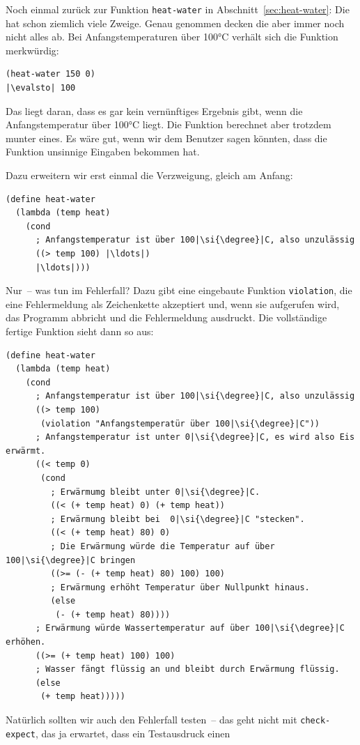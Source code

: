 Noch einmal zurück zur Funktion \lstinline{heat-water} in
Abschnitt~\ref{sec:heat-water}: Die hat schon ziemlich viele Zweige.
Genau genommen decken die aber immer noch nicht alles ab.  %
Bei Anfangstemperaturen über 100\si{\degree}C verhält sich die Funktion merkwürdig:
%
\begin{lstlisting}
(heat-water 150 0)
|\evalsto| 100
\end{lstlisting}
%
Das liegt daran, dass es gar kein vernünftiges Ergebnis gibt, wenn die
Anfangstemperatur über 100\si{\degree}C liegt.  Die Funktion berechnet aber
trotzdem munter eines.  Es wäre gut, wenn wir dem Benutzer sagen
könnten, dass die Funktion unsinnige Eingaben bekommen hat.

Dazu erweitern wir erst einmal die Verzweigung, gleich am Anfang:
%
\begin{lstlisting}
(define heat-water
  (lambda (temp heat)
    (cond
      ; Anfangstemperatur ist über 100|\si{\degree}|C, also unzulässig
      ((> temp 100) |\ldots|)
      |\ldots|)))
\end{lstlisting}
%
Nur~-- was tun im Fehlerfall?  Dazu gibt eine eingebaute Funktion
\lstinline{violation},\label{sec:violation} die eine Fehlermeldung als Zeichenkette akzeptiert
und, wenn sie aufgerufen wird, das Programm abbricht und die
Fehlermeldung ausdruckt.  Die vollständige fertige Funktion sieht
dann so aus:
%
\begin{lstlisting}
(define heat-water
  (lambda (temp heat)
    (cond
      ; Anfangstemperatur ist über 100|\si{\degree}|C, also unzulässig
      ((> temp 100)
       (violation "Anfangstemperatür über 100|\si{\degree}|C"))
      ; Anfangstemperatur ist unter 0|\si{\degree}|C, es wird also Eis erwärmt.
      ((< temp 0)
       (cond
         ; Erwärmumg bleibt unter 0|\si{\degree}|C.
         ((< (+ temp heat) 0) (+ temp heat))
         ; Erwärmung bleibt bei  0|\si{\degree}|C "stecken".
         ((< (+ temp heat) 80) 0)
         ; Die Erwärmung würde die Temperatur auf über 100|\si{\degree}|C bringen
         ((>= (- (+ temp heat) 80) 100) 100)
         ; Erwärmung erhöht Temperatur über Nullpunkt hinaus.
         (else
          (- (+ temp heat) 80))))
      ; Erwärmung würde Wassertemperatur auf über 100|\si{\degree}|C erhöhen.
      ((>= (+ temp heat) 100) 100)
      ; Wasser fängt flüssig an und bleibt durch Erwärmung flüssig.
      (else
       (+ temp heat)))))
\end{lstlisting}
%
Natürlich sollten wir auch den Fehlerfall testen~-- das geht nicht mit
\lstinline{check-expect}, das ja erwartet, dass ein Testausdruck einen
